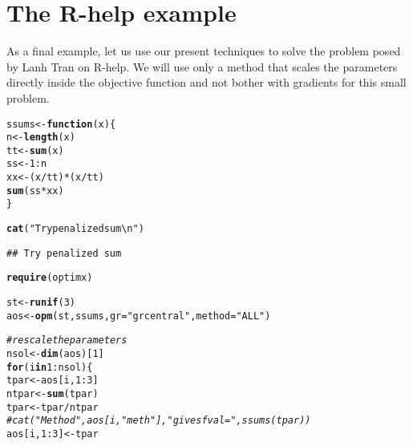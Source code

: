 \documentclass[11pt]{article}\usepackage[]{graphicx}\usepackage[]{color}
\makeatletter
\newcommand{\hlnum}[1]{\textcolor[rgb]{0.686,0.059,0.569}{#1}}%
\newcommand{\hlstr}[1]{\textcolor[rgb]{0.192,0.494,0.8}{#1}}%
\newcommand{\hlcom}[1]{\textcolor[rgb]{0.678,0.584,0.686}{\textit{#1}}}%
\newcommand{\hlopt}[1]{\textcolor[rgb]{0,0,0}{#1}}%
\newcommand{\hlstd}[1]{\textcolor[rgb]{0.345,0.345,0.345}{#1}}%
\newcommand{\hlkwa}[1]{\textcolor[rgb]{0.161,0.373,0.58}{\textbf{#1}}}%
\newcommand{\hlkwb}[1]{\textcolor[rgb]{0.69,0.353,0.396}{#1}}%
\newcommand{\hlkwc}[1]{\textcolor[rgb]{0.333,0.667,0.333}{#1}}%
\newcommand{\hlkwd}[1]{\textcolor[rgb]{0.737,0.353,0.396}{\textbf{#1}}}%
\newenvironment{kframe}{%
 \def\at@end@of@kframe{}%
 \ifinner\ifhmode%
  \def\at@end@of@kframe{\end{minipage}}%
  \begin{minipage}{\columnwidth}%
 \fi\fi%
 \def\FrameCommand##1{\hskip\@totalleftmargin \hskip-\fboxsep
 \colorbox{shadecolor}{##1}\hskip-\fboxsep
     \hskip-\linewidth \hskip-\@totalleftmargin \hskip\columnwidth}%
 \MakeFramed {\advance\hsize-\width
   \@totalleftmargin\z@ \linewidth\hsize
   \@setminipage}}%
 {\par\unskip\endMakeFramed%
 \at@end@of@kframe}
\newenvironment{knitrout}{}{} %
\makeatother
\begin{document}
\section{The R-help example}

As a final example, let us use our present techniques to solve the 
problem posed by Lanh Tran on R-help. We will use
only a method that scales the parameters directly inside the objective function and 
not bother with gradients for this small problem. 

\begin{knitrout}\scriptsize
{}\color{fgcolor}\begin{kframe}
\begin{alltt}
\hlstd{ssums}\hlkwb{<-}\hlkwa{function}\hlstd{(}\hlkwc{x}\hlstd{)\{}
  \hlstd{n}\hlkwb{<-}\hlkwd{length}\hlstd{(x)}
  \hlstd{tt}\hlkwb{<-}\hlkwd{sum}\hlstd{(x)}
  \hlstd{ss}\hlkwb{<-}\hlnum{1}\hlopt{:}\hlstd{n}
  \hlstd{xx}\hlkwb{<-}\hlstd{(x}\hlopt{/}\hlstd{tt)}\hlopt{*}\hlstd{(x}\hlopt{/}\hlstd{tt)}
  \hlkwd{sum}\hlstd{(ss}\hlopt{*}\hlstd{xx)}
\hlstd{\}}

\hlkwd{cat}\hlstd{(}\hlstr{"Try penalized sum\textbackslash{}n"}\hlstd{)}
\end{alltt}
\begin{verbatim}
## Try penalized sum
\end{verbatim}
\begin{alltt}
\hlkwd{require}\hlstd{(optimx)}
\end{alltt}


{\ttfamily\noindent\itshape\color{messagecolor}{\#\# Loading required package: optimx}}

{\ttfamily\noindent\color{warningcolor}{\#\# Warning in library(package, lib.loc = lib.loc, character.only = TRUE, logical.return = TRUE, : there is no package called 'optimx'}}\begin{alltt}
\hlstd{st}\hlkwb{<-}\hlkwd{runif}\hlstd{(}\hlnum{3}\hlstd{)}
\hlstd{aos}\hlkwb{<-}\hlkwd{opm}\hlstd{(st, ssums,} \hlkwc{gr}\hlstd{=}\hlstr{"grcentral"}\hlstd{,} \hlkwc{method}\hlstd{=}\hlstr{"ALL"}\hlstd{)}
\end{alltt}


{\ttfamily\noindent\color{warningcolor}{\#\# Warning in optimr(par, fn, gr, method = meth, lower = lower, upper = upper, : Successful convergence\ \ Restarts for stagnation =0}}\begin{alltt}
\hlcom{# rescale the parameters}
\hlstd{nsol}\hlkwb{<-}\hlkwd{dim}\hlstd{(aos)[}\hlnum{1}\hlstd{]}
\hlkwa{for} \hlstd{(i} \hlkwa{in} \hlnum{1}\hlopt{:}\hlstd{nsol)\{}
  \hlstd{tpar}\hlkwb{<-}\hlstd{aos[i,}\hlnum{1}\hlopt{:}\hlnum{3}\hlstd{]}
  \hlstd{ntpar}\hlkwb{<-}\hlkwd{sum}\hlstd{(tpar)}
  \hlstd{tpar}\hlkwb{<-}\hlstd{tpar}\hlopt{/}\hlstd{ntpar}
\hlcom{#  cat("Method ",aos[i, "meth"]," gives fval =", ssums(tpar))}
  \hlstd{aos[i,} \hlnum{1}\hlopt{:}\hlnum{3}\hlstd{]}\hlkwb{<-}\hlstd{tpar}


\end{alltt}
\end{kframe}
\end{knitrout}
\end{document}
